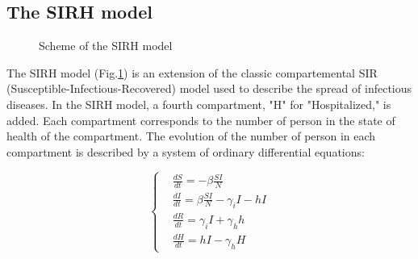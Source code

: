 \subsection{The SIRH model}



\begin{figure}[h]
    \centering
    \caption{Scheme of the SIRH model}
    \label{fig:sirh}

    
\end{figure}

The SIRH model (Fig.\ref{fig:sirh}) is an extension of the classic compartemental SIR (Susceptible-Infectious-Recovered) model used to describe the spread of infectious diseases.
In the SIRH model, a fourth compartment, "H" for "Hospitalized," is added. 
Each compartment corresponds to the number of person in the state of health of the compartment. 
The evolution of the number of person in each compartment is described by a system of ordinary differential equations: 

\begin{equation}
    \label{eq:sirh}
    \left\{
    \begin{aligned}
        &\frac{dS}{dt} = - \beta \frac{SI}{N} \\
        &\frac{dI}{dt} = \beta \frac{SI}{N} - \gamma_i I - h I \\
        &\frac{dR}{dt} = \gamma_i I + \gamma_h h \\
        &\frac{dH}{dt} = h I - \gamma_h H
    \end{aligned}
    \right.
\end{equation}


